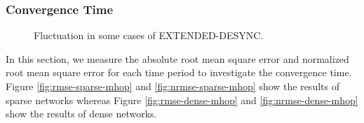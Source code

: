 \subsubsection{Convergence Time}
\begin{figure}
\centerline{
  \hfil
}
\caption{Fluctuation in some cases of EXTENDED-DESYNC.}
\label{fig:fluctuate}
\lofcont
\end{figure}
In this section, we measure the absolute root mean square error and normalized root mean square error for each time period to investigate the convergence time.
Figure \ref{fig:rmse-sparse-mhop} and \ref{fig:nrmse-sparse-mhop} show the results of sparse networks whereas Figure \ref{fig:rmse-dense-mhop} and \ref{fig:nrmse-dense-mhop} show the results of dense networks.

